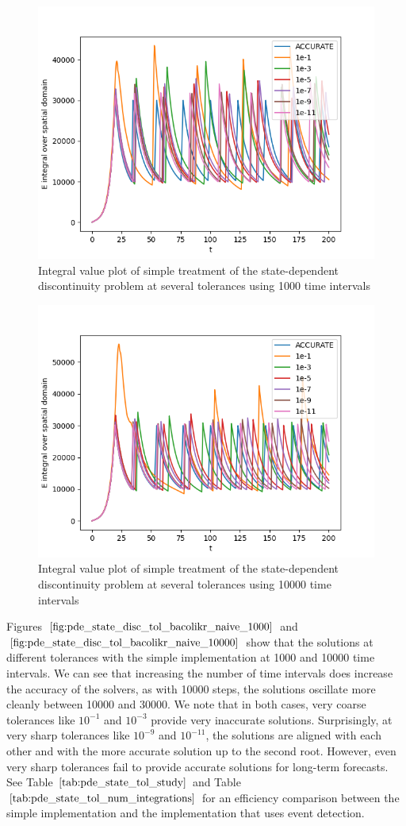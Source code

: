 \begin{figure}[H]
\centering
\includegraphics[width=0.7\linewidth]{./figures/pde_state_disc_tol_bacolikr_naive_1000}
\caption{Integral value plot of simple treatment of the state-dependent discontinuity problem at several tolerances using 1000 time intervals}
\label{fig:pde_state_disc_tol_bacolikr_naive_1000}
\end{figure}

\begin{figure}[H]
\centering
\includegraphics[width=0.7\linewidth]{./figures/pde_state_disc_tol_bacolikr_naive_10000}
\caption{Integral value plot of simple treatment of the state-dependent discontinuity problem at several tolerances using 10000 time intervals}
\label{fig:pde_state_disc_tol_bacolikr_naive_10000}
\end{figure}

Figures $\ref{fig:pde_state_disc_tol_bacolikr_naive_1000}$ and $\ref{fig:pde_state_disc_tol_bacolikr_naive_10000}$ show that the solutions at different tolerances with the simple implementation at 1000 and 10000 time intervals. We can see that increasing the number of time intervals does increase the accuracy of the solvers, as with 10000 steps, the solutions oscillate more cleanly between 10000 and 30000. We note that in both cases, very coarse tolerances like $10^{-1}$ and $10^{-3}$ provide very inaccurate solutions. Surprisingly, at very sharp tolerances like $10^{-9}$ and $10^{-11}$, the solutions are aligned with each other and with the more accurate solution up to the second root. However, even very sharp tolerances fail to provide accurate solutions for long-term forecasts. See Table $\ref{tab:pde_state_tol_study}$ and Table $\ref{tab:pde_state_tol_num_integrations}$ for an efficiency comparison between the simple implementation and the implementation that uses event detection. 

